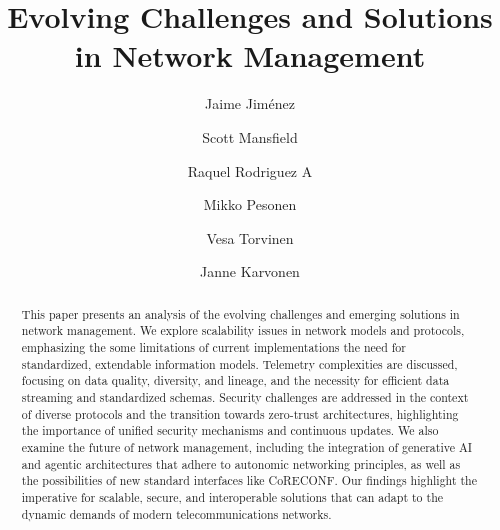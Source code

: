 \documentclass[10pt,sigconf]{iabart}
\begin{document}
\title{Evolving Challenges and Solutions in Network Management}

\author{Jaime Jiménez}

\author{Scott Mansfield}

\author{Raquel Rodriguez A}

\author{Mikko Pesonen}

\author{Vesa Torvinen}

\author{Janne Karvonen}


\begin{abstract}

This paper presents an analysis of the evolving challenges and emerging solutions in network management. We explore scalability issues in network models and protocols, emphasizing the some limitations of current implementations the need for standardized, extendable information models. Telemetry complexities are discussed, focusing on data quality, diversity, and lineage, and the necessity for efficient data streaming and standardized schemas. Security challenges are addressed in the context of diverse protocols and the transition towards zero-trust architectures, highlighting the importance of unified security mechanisms and continuous updates. We also examine the future of network management, including the integration of generative AI and agentic architectures that adhere to autonomic networking principles, as well as the possibilities of new standard interfaces like CoRECONF. Our findings highlight the imperative for scalable, secure, and interoperable solutions that can adapt to the dynamic demands of modern telecommunications networks.

\end{abstract}
\end{document}
